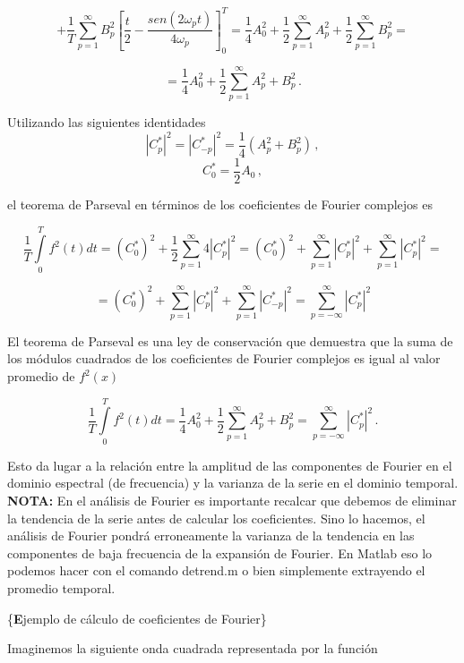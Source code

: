 \documentclass[
]{agujournal2019}
\begin{document}
\[+\frac{1}{T}\sum\limits^\infty_{p=1}B^2_p\left[ \frac{t}{2} - \frac{sen(2\omega_p t)}{4\omega_p}\right]^T_0=
\frac{1}{4}A^2_0 + \frac{1}{2}\sum\limits^\infty_{p=1}A_p^2 + \frac{1}{2}\sum\limits^\infty_{p=1}B_p^2=\]

\[=\frac{1}{4}A^2_0 + \frac{1}{2}\sum\limits^\infty_{p=1} A_p^2 + B_p^2\,.\]

Utilizando las siguientes identidades
\[|C^*_p|^2=|C^*_{-p}|^2=\frac{1}{4}(A_p^2 + B_p^2)\,,\]
\[C^*_0=\frac{1}{2}A_0\,,\]

el teorema de Parseval en términos de los coeficientes de Fourier
complejos es

\[\frac{1}{T}\int\limits^{T}_0 f^2(t) dt=(C^*_0)^2 + \frac{1}{2}\sum\limits^\infty_{p=1} 4|C^*_p|^2=
(C^*_0)^2 + \sum\limits^\infty_{p=1} |C^*_p|^2 + \sum\limits^\infty_{p=1} 
|C^*_p|^2=\]

\[=(C^*_0)^2 + \sum\limits^\infty_{p=1} |C^*_p|^2 + \sum\limits^\infty_{p=1} |C^*_{-p}|^2=
\sum\limits^\infty_{p=-\infty} |C^*_p|^2\]

\newpage

\begin{framed}
El teorema de Parseval es una ley de conservación que demuestra que la suma de los módulos cuadrados
de los coeficientes de Fourier complejos es igual al valor promedio de
$f^2(x)$

$$\frac{1}{T}\int\limits^{T}_0 f^2(t) dt=\frac{1}{4}A^2_0 + 
\frac{1}{2}\sum\limits^\infty_{p=1} A_p^2 + B_p^2=
\sum\limits^\infty_{p=-\infty} |C^*_p|^2\,.$$

\end{framed}

Esto da lugar a la relación entre la amplitud de las componentes de
Fourier en el dominio espectral (de frecuencia) y la varianza de la
serie en el dominio temporal.\\

\textbf{NOTA:} En el análisis de Fourier es importante recalcar que
debemos de eliminar la tendencia de la serie antes de calcular los
coeficientes. Sino lo hacemos, el análisis de Fourier pondrá
erroneamente la varianza de la tendencia en las componentes de baja
frecuencia de la expansión de Fourier. En Matlab eso lo podemos hacer
con el comando detrend.m o bien simplemente extrayendo el promedio
temporal.

\vspace{0.75cm}

\{\textbf Ejemplo de cálculo de coeficientes de Fourier\}

Imaginemos la siguiente onda cuadrada representada por la función
\end{document}
